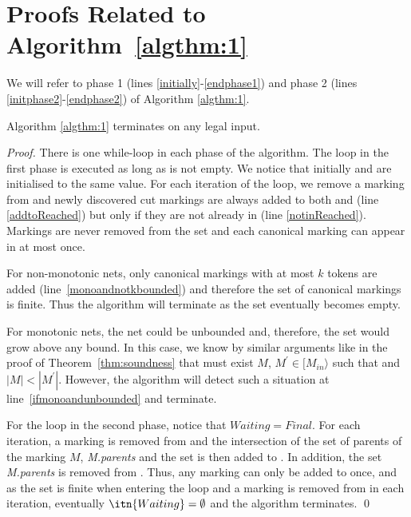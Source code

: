 \section{Proofs Related to Algorithm~\ref{algthm:1}}\label{algthm:1:proofs}

We will refer to phase 1 (lines \ref{initially}-\ref{endphase1}) and phase 2 (lines \ref{initphase2}-\ref{endphase2}) of Algorithm \ref{algthm:1}.

\begin{lemma}[Termination]
	\label{algthm:1:termination}
	Algorithm \ref{algthm:1} terminates on any legal input.
\end{lemma}

\begin{proof}%
	 There is one while-loop in each phase of the algorithm. The loop in the first phase is executed as long as  is not empty. 
	We notice that initially  and  are initialised to the same value.
	For each iteration of the loop, we remove a marking from  
        and newly discovered cut markings are always added to both 
         and 
        (line \ref{addtoReached}) but only if they 
        are not already in  (line \ref{notinReached}).
        Markings are never removed from the set  and
        each canonical marking can appear in  at most once.

	For non-monotonic nets, only canonical markings with at most
        $k$ tokens are added (line~\ref{monoandnotkbounded}) 
        and therefore the set of canonical markings is finite. 
        Thus the algorithm will terminate as the set  
        eventually becomes empty.

        For monotonic nets, the net
        could be unbounded and, therefore, the set  would grow above any
        bound. In this case, we know by similar arguments 
        like in the proof of Theorem~\ref{thm:soundness} that must 
        exist $M$, $M^\prime \in [ M_{in}\rangle$ such that 
         and $|M| < |M^\prime|$. However,
        the algorithm will detect such a situation 
        at line~\ref{ifmonoandunbounded} and terminate.

	For the loop in the second phase, 
        notice that $\mathit{Waiting} = \mathit{Final}$. 
	For each iteration, a marking is removed from  and 
        the intersection of the set of parents of the marking $M$, 
        \emph{M.parents} and the set  is then added to 
        . In addition, the set \emph{M.parents} is removed 
        from . Thus, any marking can only be added to 
         once, and as the set 
        is finite when entering the loop and a marking is removed from 
         in each iteration, 
        eventually $\itn{Waiting} = \emptyset$ and the algorithm terminates.	
\qed
\end{proof}



